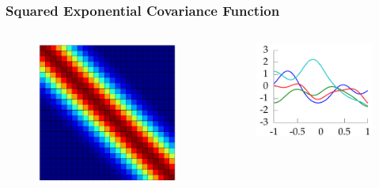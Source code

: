 \documentclass[10pt]{beamer}
\begin{document}
  \begin{frame}
    \frametitle{Squared Exponential Covariance Function}

    \begin{columns}
      \begin{column}{0.35\textwidth}
        \begin{figure}
          \centering
          \includegraphics[width=\textwidth]{kernelMatrix.png}
        \end{figure}
      \end{column}

      \begin{column}{0.45\textwidth}
        \begin{figure}
          \centering
          \includegraphics[width=\textwidth]{samplePaths.png}
        \end{figure}
      \end{column}
    \end{columns}
  \end{frame}
\end{document}

